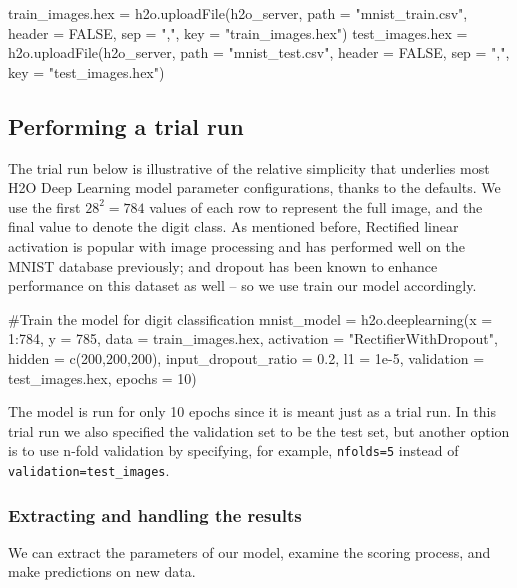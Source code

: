 \documentclass[11pt]{article}
\begin{document}
\begin{spverbatim}
train_images.hex = h2o.uploadFile(h2o_server, path = "mnist_train.csv", header = FALSE, sep = ",", key = "train_images.hex")
test_images.hex = h2o.uploadFile(h2o_server, path = "mnist_test.csv", header = FALSE, sep = ",", key = "test_images.hex")
\end{spverbatim}


\subsection{Performing a trial run} \label{3.2}
The trial run below is illustrative of the relative simplicity that underlies most H2O Deep Learning model parameter configurations, thanks to the defaults. We use the first $28^2 = 784$ values of each row to represent the full image, and the final value to denote the digit class. As mentioned before, Rectified linear activation is popular with image processing and has performed well on the MNIST database previously; and dropout has been known to enhance performance on this dataset as well -- so we use train our model accordingly. 
\begin{spverbatim}

#Train the model for digit classification
mnist_model = h2o.deeplearning(x = 1:784, y = 785, data = train_images.hex, activation = "RectifierWithDropout", hidden = c(200,200,200), input_dropout_ratio = 0.2, l1 = 1e-5, validation = test_images.hex, epochs = 10)

\end{spverbatim}
\noindent
The model is run for only 10 epochs since it is meant just as a trial run. In this trial run we also specified the validation set to be the test set, but another option is to use n-fold validation by specifying, for example, \texttt{nfolds=5} instead of \texttt{validation=test\_images}. 

\subsubsection{Extracting and handling the results} \label{3.2.1}

We can extract the parameters of our model, examine the scoring process, and make predictions on new data.
\end{document}
